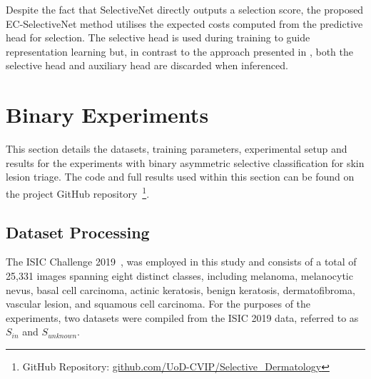Despite the fact that SelectiveNet directly outputs a selection score, the proposed EC-SelectiveNet method utilises the expected costs computed from the predictive head for selection. The selective head is used during training to guide representation learning but, in contrast to the approach presented in \cite{selective2019geifman}, both the selective head and auxiliary head are discarded when inferenced.



\section{Binary Experiments}
\label{sec:selective_binary_experiment}
This section details the datasets, training parameters, experimental setup and results for the experiments with binary asymmetric selective classification for skin lesion triage. The code and full results used within this section can be found on the project GitHub repository~\footnote{GitHub Repository: \url{github.com/UoD-CVIP/Selective_Dermatology}}.

\subsection{Dataset Processing}
\label{subsec:selective_binary_dataset}
The ISIC Challenge 2019~\citep{codella2018skin,combalia2019bcn20000,tschandl2018ham10000}, was employed in this study and consists of a total of 25,331 images spanning eight distinct classes, including melanoma, melanocytic nevus, basal cell carcinoma, actinic keratosis, benign keratosis, dermatofibroma, vascular lesion, and squamous cell carcinoma. For the purposes of the experiments, two datasets were compiled from the ISIC 2019 data, referred to as $S_{in}$ and $S_{unknown}$.

